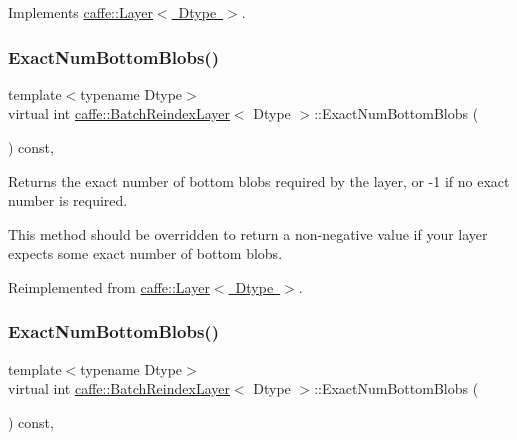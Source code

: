 Implements \mbox{\hyperlink{classcaffe_1_1_layer_a75c9b2a321dc713e0eaef530d02dc37f}{caffe\+::\+Layer$<$ Dtype $>$}}.

\mbox{\label{classcaffe_1_1_batch_reindex_layer_a4120d2fd610655c7ad3d846637564bc6}} 
\subsubsection{\texorpdfstring{Exact\+Num\+Bottom\+Blobs()}{ExactNumBottomBlobs()}\hspace{0.1cm}{\footnotesize\ttfamily [1/2]}}
{\footnotesize\ttfamily template$<$typename Dtype$>$ \\
virtual int \mbox{\hyperlink{classcaffe_1_1_batch_reindex_layer}{caffe\+::\+Batch\+Reindex\+Layer}}$<$ Dtype $>$\+::Exact\+Num\+Bottom\+Blobs (\begin{DoxyParamCaption}{ }\end{DoxyParamCaption}) const\hspace{0.3cm}{\ttfamily [inline]}, {\ttfamily [virtual]}}



Returns the exact number of bottom blobs required by the layer, or -\/1 if no exact number is required. 

This method should be overridden to return a non-\/negative value if your layer expects some exact number of bottom blobs. 

Reimplemented from \mbox{\hyperlink{classcaffe_1_1_layer_a8e5ee0494d85f5f55fc4396537cbc60f}{caffe\+::\+Layer$<$ Dtype $>$}}.

\mbox{\label{classcaffe_1_1_batch_reindex_layer_a4120d2fd610655c7ad3d846637564bc6}} 
\subsubsection{\texorpdfstring{Exact\+Num\+Bottom\+Blobs()}{ExactNumBottomBlobs()}\hspace{0.1cm}{\footnotesize\ttfamily [2/2]}}
{\footnotesize\ttfamily template$<$typename Dtype$>$ \\
virtual int \mbox{\hyperlink{classcaffe_1_1_batch_reindex_layer}{caffe\+::\+Batch\+Reindex\+Layer}}$<$ Dtype $>$\+::Exact\+Num\+Bottom\+Blobs (\begin{DoxyParamCaption}{ }\end{DoxyParamCaption}) const\hspace{0.3cm}{\ttfamily [inline]}, {\ttfamily [virtual]}}



